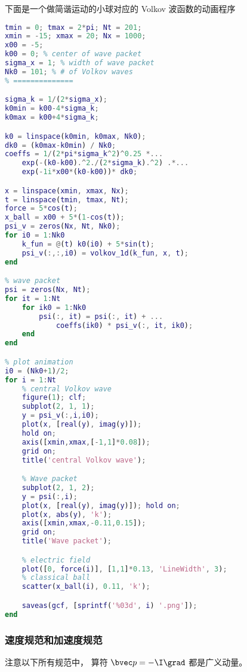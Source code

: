 下面是一个做简谐运动的小球对应的 Volkov 波函数的动画程序
\begin{lstlisting}[language=matlab, caption=volkov\_test.m]
% === params ===
tmin = 0; tmax = 2*pi; Nt = 201;
xmin = -15; xmax = 20; Nx = 1000;
x00 = -5;
k00 = 0; % center of wave packet
sigma_x = 1; % width of wave packet
Nk0 = 101; % # of Volkov waves
% ==============

sigma_k = 1/(2*sigma_x);
k0min = k00-4*sigma_k;
k0max = k00+4*sigma_k;

k0 = linspace(k0min, k0max, Nk0);
dk0 = (k0max-k0min) / Nk0;
coeffs = 1/(2*pi*sigma_k^2)^0.25 *...
    exp(-(k0-k00).^2./(2*sigma_k).^2) .*...
    exp(-1i*x00*(k0-k00))* dk0;

x = linspace(xmin, xmax, Nx);
t = linspace(tmin, tmax, Nt);
force = 5*cos(t);
x_ball = x00 + 5*(1-cos(t));
psi_v = zeros(Nx, Nt, Nk0);
for i0 = 1:Nk0
    k_fun = @(t) k0(i0) + 5*sin(t);
    psi_v(:,:,i0) = volkov_1d(k_fun, x, t);
end

% wave packet
psi = zeros(Nx, Nt);
for it = 1:Nt
    for ik0 = 1:Nk0
        psi(:, it) = psi(:, it) + ...
            coeffs(ik0) * psi_v(:, it, ik0);
    end
end

% plot animation
i0 = (Nk0+1)/2;
for i = 1:Nt
    % central Volkov wave
    figure(1); clf;
    subplot(2, 1, 1);
    y = psi_v(:,i,i0);
    plot(x, [real(y), imag(y)]);
    hold on;
    axis([xmin,xmax,[-1,1]*0.08]);
    grid on;
    title('central Volkov wave');

    % Wave packet
    subplot(2, 1, 2);
    y = psi(:,i);
    plot(x, [real(y), imag(y)]); hold on;
    plot(x, abs(y), 'k');
    axis([xmin,xmax,-0.11,0.15]);
    grid on;
    title('Wave packet');

    % electric field
    plot([0, force(i)], [1,1]*0.13, 'LineWidth', 3);
    % classical ball
    scatter(x_ball(i), 0.11, 'k');

    saveas(gcf, [sprintf('%03d', i) '.png']);
end
\end{lstlisting}


\subsubsection{速度规范和加速度规范}
注意以下所有规范中， 算符 $\bvec p = -\I \grad$ 都是广义动量。

